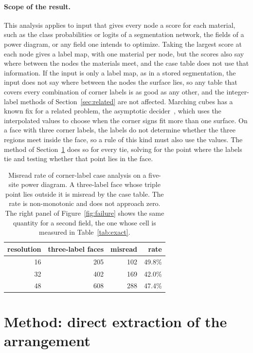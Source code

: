 \documentclass{egpubl}
\theoremstyle{definition}
\begin{document}
\paragraph{Scope of the result.} This analysis applies to input that gives every
node a score for each material, such as the class probabilities or logits of
a segmentation network, the fields of a power diagram, or any field one
intends to optimize. Taking the largest score at each node gives a label map,
with one material per node, but the scores also say where between the nodes
the materials meet, and the case table does not use that information. If the input is only a
label map, as in a stored segmentation, the input does not say where between
the nodes the surface lies, so any table that covers every combination of
corner labels is as good as any other, and the integer-label methods of
Section~\ref{sec:related} are not affected. Marching cubes has a known fix for a related problem, the
asymptotic decider~\cite{nielson1991}, which uses the interpolated values to
choose when the corner signs fit more than one surface. On a face with three
corner labels, the labels do not determine whether the three regions meet
inside the face, so a rule of this kind must also use the values. The method
of Section~\ref{sec:method} does so for every tie, solving for the point
where the labels tie and testing whether that point lies in the face.

\begin{table}[tbp]
\centering
\caption{Misread rate of corner-label case analysis on a five-site power
diagram. A three-label face whose triple point lies outside it is misread by
the case table. The rate is non-monotonic and does not approach zero. The
right panel of Figure~\ref{fig:failure} shows the same quantity for a second
field, the one whose cell is measured in Table~\ref{tab:exact}.}
\label{tab:failure}
\begin{tabular}{@{}rrrr@{}}
\toprule
resolution & three-label faces & misread & rate \\
\midrule
16 & 205 & 102 & 49.8\% \\
32 & 402 & 169 & 42.0\% \\
48 & 608 & 288 & 47.4\% \\
\bottomrule
\end{tabular}
\end{table}

\section{Method: direct extraction of the arrangement}
\label{sec:method}
\end{document}
